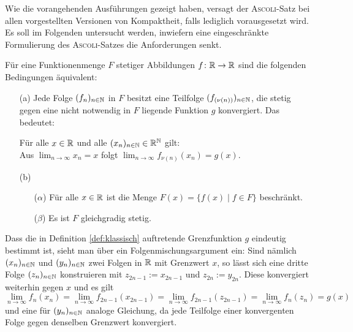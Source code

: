 Wie die vorangehenden Ausführungen gezeigt haben, versagt der \textsc{Ascoli}\hyp{}Satz bei allen vorgestellten Versionen von Kompaktheit, falls lediglich \ZF vorausgesetzt wird. 
Es soll im Folgenden untersucht werden, inwiefern eine eingeschränkte Formulierung des \textsc{Ascoli}\hyp{}Satzes die Anforderungen senkt.

\begin{defn} 
  \label{def:klassisch}
  Für eine Funktionenmenge $F$ stetiger Abbildungen $f \colon \mathbb{R} \to \mathbb{R}$ sind die folgenden Bedingungen äquivalent:
  \begin{itemize}
    \item[(a)] Jede Folge $(f_n)_{n \in \mathbb{N}}$ in $F$ besitzt eine Teilfolge $(f_{(\nu(n))})_{n \in \mathbb{N}}$, die stetig gegen eine nicht notwendig in $F$ liegende Funktion $g$ konvergiert. Das bedeutet:
      \begin{addmargin}[2em]{2em}%
        Für alle $x \in \mathbb{R}$ und alle $(x_n)_{n \in \mathbb{N}} \in \mathbb{R}^{\mathbb{N}}$ gilt: \\
        Aus $\lim_{n \to \infty} x_n = x$ folgt $\lim_{n \to \infty} f_{\nu(n)}(x_n) = g(x)$.
      \end{addmargin}
    \item[(b)]
      \begin{itemize}
        \item[($\alpha$)] Für alle $x \in \mathbb{R}$ ist die Menge $F(x) = \{ f(x) \mid f \in F\}$ beschränkt.
        \item[($\beta$)] Es ist $F$ gleichgradig stetig.
      \end{itemize}
  \end{itemize}
\end{defn}

Dass die in Definition \ref{def:klassisch} auftretende Grenzfunktion $g$ eindeutig bestimmt ist, sieht man über ein Folgenmischungsargument ein:
Sind nämlich $(x_n)_{n \in \mathbb{N}}$ und $(y_n)_{n \in \mathbb{N}}$ zwei Folgen in $\mathbb{R}$ mit Grenzwert $x$, so lässt sich eine dritte Folge $(z_n)_{n \in \mathbb{N}}$ konstruieren mit $z_{2n-1} := x_{2n-1}$ und $z_{2n} := y_{2n}$.
Diese konvergiert weiterhin gegen $x$ und es gilt 
\begin{displaymath}
   \lim_{n \to \infty} f_{n}(x_n) 
  =\lim_{n \to \infty} f_{2n-1}(x_{2n-1}) 
  =\lim_{n \to \infty} f_{2n-1}(z_{2n-1}) 
  =\lim_{n \to \infty} f_n(z_n) = g(x)
\end{displaymath}
und eine für $(y_n)_{n \in \mathbb{N}}$ analoge Gleichung, da jede Teilfolge einer konvergenten Folge gegen denselben Grenzwert konvergiert.

